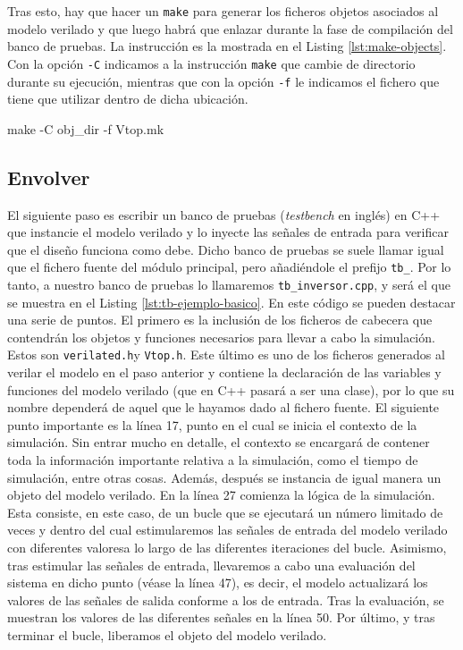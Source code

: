 Tras esto, hay que hacer un \verb|make| para generar los ficheros objetos asociados al modelo verilado y que luego habrá que enlazar durante la fase de compilación del banco de pruebas. La instrucción es la mostrada en el Listing \ref{lst:make-objects}. Con la opción \verb|-C| indicamos a la instrucción \verb|make| que cambie de directorio durante su ejecución, mientras que con la opción \verb|-f| le indicamos el fichero que tiene que utilizar dentro de dicha ubicación.

\begin{mycode}[style=bashstyle, label=lst:make-objects, caption={Construcción de los ficheros objeto.}]
make -C obj_dir -f Vtop.mk
\end{mycode}

\subsection{Envolver}
El siguiente paso es escribir un banco de pruebas (\textit{testbench} en inglés) en C++ que instancie el modelo verilado y lo inyecte las señales de entrada para verificar que el diseño funciona como debe. Dicho banco de pruebas se suele llamar igual que el fichero fuente del módulo principal, pero añadiéndole el prefijo \verb|tb_|. Por lo tanto, a nuestro banco de pruebas lo llamaremos \verb|tb_inversor.cpp|, y será el que se muestra en el Listing \ref{lst:tb-ejemplo-basico}. En este código se pueden destacar una serie de puntos. El primero es la inclusión de los ficheros de cabecera que contendrán los objetos y funciones necesarios para llevar a cabo la simulación. Estos son \verb|verilated.h|y \verb|Vtop.h|. Este último es uno de los ficheros generados al verilar el modelo en el paso anterior y contiene la declaración de las variables y funciones del modelo verilado (que en C++ pasará a ser una clase), por lo que su nombre dependerá de aquel que le hayamos dado al fichero fuente. El siguiente punto importante es la línea 17, punto en el cual se inicia el contexto de la simulación. Sin entrar mucho en detalle, el contexto se encargará de contener toda la información importante relativa a la simulación, como el tiempo de simulación, entre otras cosas. Además, después se instancia de igual manera un objeto del modelo verilado. En la línea 27 comienza la lógica de la simulación. Esta consiste, en este caso, de un bucle que se ejecutará un número limitado de veces y dentro del cual estimularemos las señales de entrada del modelo verilado con diferentes valoresa lo largo de las diferentes iteraciones del bucle. Asimismo, tras estimular las señales de entrada, llevaremos a cabo una evaluación del sistema en dicho punto (véase la línea 47), es decir, el modelo actualizará los valores de las señales de salida conforme a los de entrada. Tras la evaluación, se muestran los valores de las diferentes señales en la línea 50. Por último, y tras terminar el bucle, liberamos el objeto del modelo verilado.

